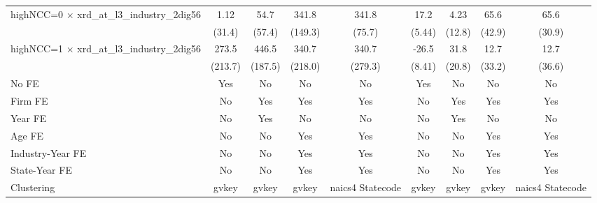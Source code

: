 {\begin{tabular}{l*{8}{c}}
\addlinespace
highNCC=0 $\times$ xrd\_at\_l3\_industry\_2dig56&        1.12         &        54.7         &       341.8\sym{**} &       341.8\sym{***}&        17.2\sym{***}&        4.23         &        65.6         &        65.6\sym{**} \\
                    &      (31.4)         &      (57.4)         &     (149.3)         &      (75.7)         &      (5.44)         &      (12.8)         &      (42.9)         &      (30.9)         \\
\addlinespace
highNCC=1 $\times$ xrd\_at\_l3\_industry\_2dig56&       273.5         &       446.5\sym{**} &       340.7         &       340.7         &       -26.5\sym{***}&        31.8         &        12.7         &        12.7         \\
                    &     (213.7)         &     (187.5)         &     (218.0)         &     (279.3)         &      (8.41)         &      (20.8)         &      (33.2)         &      (36.6)         \\
\addlinespace
No FE               &         Yes         &          No         &          No         &          No         &         Yes         &          No         &          No         &          No         \\
\addlinespace
Firm FE             &          No         &         Yes         &         Yes         &         Yes         &          No         &         Yes         &         Yes         &         Yes         \\
\addlinespace
Year FE             &          No         &         Yes         &          No         &          No         &          No         &         Yes         &          No         &          No         \\
\addlinespace
Age FE              &          No         &          No         &         Yes         &         Yes         &          No         &          No         &         Yes         &         Yes         \\
\addlinespace
Industry-Year FE    &          No         &          No         &         Yes         &         Yes         &          No         &          No         &         Yes         &         Yes         \\
\addlinespace
State-Year FE       &          No         &          No         &         Yes         &         Yes         &          No         &          No         &         Yes         &         Yes         \\
\midrule
Clustering          &       gvkey         &       gvkey         &       gvkey         &naics4 Statecode         &       gvkey         &       gvkey         &       gvkey         &naics4 Statecode         \\

\end{tabular}}
